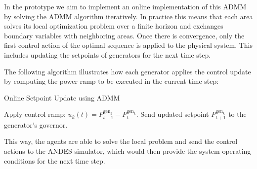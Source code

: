 \documentclass{article}
\begin{document}
In the prototype we aim to implement an online implementation of this ADMM by solving the ADMM algorithm iteratively. In practice this means that each area solves its local optimization problem over a finite horizon and exchanges boundary variables  with neighboring areas. Once there is convergence, only the first control action of the optimal sequence is applied to the physical system. This includes updating the setpoints of generators for the next time step. 

The following algorithm illustrates how each generator applies the control update by computing the power ramp to be executed in the current time step:

\begin{algorithm}
\caption{Online Setpoint Update using ADMM}
\begin{algorithmic}
        \State Apply control ramp: $u_k(t) = P^{\text{gen}_k}_{t+1} - P^{\text{gen}_k}_t$.
        \State Send updated setpoint $P^{\text{gen}_k}_{t+1}$ to the generator's governor.
    \EndFor
\end{algorithmic}
\end{algorithm}
This way, the agents are able to solve the local problem and send the control actions to the ANDES simulator, which would then provide the system operating conditions for the next time step.

\newpage
\clearpage
\nocite{*}  
\printbibliography
\end{document}
